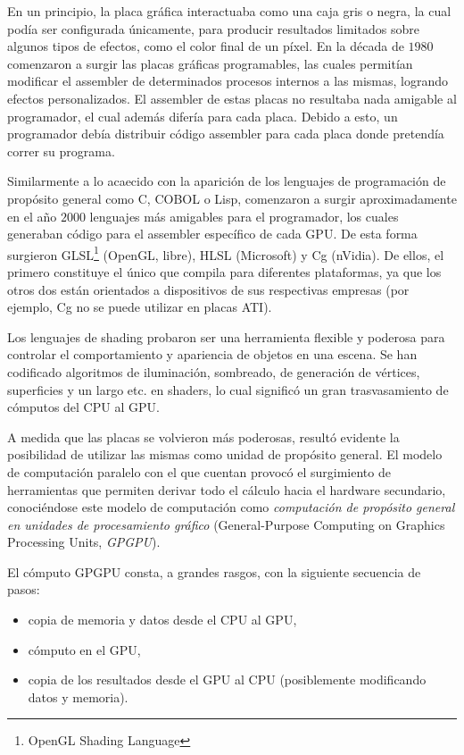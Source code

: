 En un principio, la placa gráfica interactuaba como una caja gris o negra, la cual podía ser configurada únicamente, para producir resultados limitados sobre algunos tipos de efectos, como el color final de un píxel.
En la década de $1980$ comenzaron a surgir las placas gráficas programables, las cuales permitían modificar el assembler de determinados procesos internos a las mismas, logrando efectos personalizados.
El assembler de estas placas no resultaba nada amigable al programador, el cual además difería para cada placa.
Debido a esto, un programador debía distribuir código assembler para cada placa donde pretendía correr su programa.

Similarmente a lo acaecido con la aparición de los lenguajes de programación de propósito general como C, COBOL o Lisp, comenzaron a surgir aproximadamente en el año $2000$ lenguajes más amigables para el programador, los cuales generaban código para el assembler específico de cada GPU.
De esta forma surgieron GLSL\footnote{OpenGL Shading Language} (OpenGL, libre), HLSL (Microsoft) y Cg (nVidia).
De ellos, el primero constituye el único que compila para diferentes plataformas, ya que los otros dos están orientados a dispositivos de sus respectivas empresas (por ejemplo, Cg no se puede utilizar en placas ATI).

Los lenguajes de shading probaron ser una herramienta flexible y poderosa para controlar el comportamiento y apariencia de objetos en una escena.
Se han codificado algoritmos de iluminación, sombreado, de generación de vértices, superficies y un largo etc. en shaders, lo cual significó un gran trasvasamiento de cómputos del CPU al GPU.

A medida que las placas se volvieron más poderosas, resultó evidente la posibilidad de utilizar las mismas como unidad de propósito general.
El modelo de computación paralelo con el que cuentan provocó el surgimiento de herramientas que permiten derivar todo el cálculo hacia el hardware secundario, conoci\'endose este modelo de computaci\'on como {\em computación de propósito general en unidades de procesamiento gráfico} (General-Purpose Computing on Graphics Processing Units, {\em \acrshort{GPGPU}}).

El cómputo GPGPU consta, a grandes rasgos, con la siguiente secuencia de pasos: 

\begin{itemize}
\item copia de memoria y datos desde el CPU al GPU,
\item cómputo en el GPU, 
\item copia de los resultados desde el GPU al CPU (posiblemente modificando datos y memoria).
\end{itemize}

